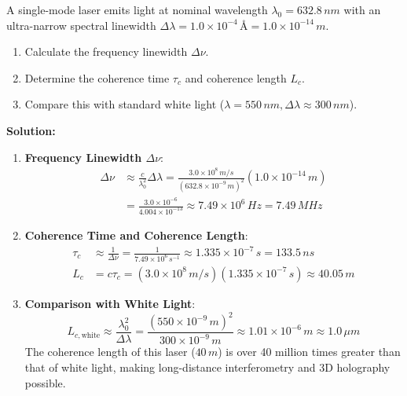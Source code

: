 \begin{example}
A single-mode laser emits light at nominal wavelength $\lambda_0 = 632.8\,\si{nm}$ with an ultra-narrow spectral linewidth $\Delta \lambda = 1.0 \times 10^{-4}\,\si{\text{\AA}} = 1.0 \times 10^{-14}\,\si{m}$.
\begin{enumerate}
    \item Calculate the frequency linewidth $\Delta \nu$.
    \item Determine the coherence time $\tau_c$ and coherence length $L_c$.
    \item Compare this with standard white light ($\lambda = 550\,\si{nm}, \Delta \lambda \approx 300\,\si{nm}$).
\end{enumerate}

\textbf{Solution:}
\begin{enumerate}
    \item \textbf{Frequency Linewidth $\Delta \nu$}:
    \begin{align*}
        \Delta \nu &\approx \frac{c}{\lambda_0^2}\Delta \lambda = \frac{3.0 \times 10^8\,\si{m/s}}{(632.8 \times 10^{-9}\,\si{m})^2} (1.0 \times 10^{-14}\,\si{m}) \\
        &= \frac{3.0 \times 10^{-6}}{4.004 \times 10^{-13}} \approx 7.49 \times 10^6\,\si{Hz} = 7.49\,\si{MHz}
    \end{align*}
    
    \item \textbf{Coherence Time and Coherence Length}:
    \begin{align*}
        \tau_c &\approx \frac{1}{\Delta \nu} = \frac{1}{7.49 \times 10^6\,\si{s^{-1}}} \approx 1.335 \times 10^{-7}\,\si{s} = 133.5\,\si{ns} \\
        L_c &= c \tau_c = (3.0 \times 10^8\,\si{m/s})(1.335 \times 10^{-7}\,\si{s}) \approx 40.05\,\si{m}
    \end{align*}
    
    \item \textbf{Comparison with White Light}:
    \begin{equation*}
        L_{c,\text{white}} \approx \frac{\lambda_0^2}{\Delta \lambda} = \frac{(550 \times 10^{-9}\,\si{m})^2}{300 \times 10^{-9}\,\si{m}} \approx 1.01 \times 10^{-6}\,\si{m} \approx 1.0\,\si{\mu m}
    \end{equation*}
    The coherence length of this laser ($40\,\si{m}$) is over 40 million times greater than that of white light, making long-distance interferometry and 3D holography possible.
\end{enumerate}
\end{example}

